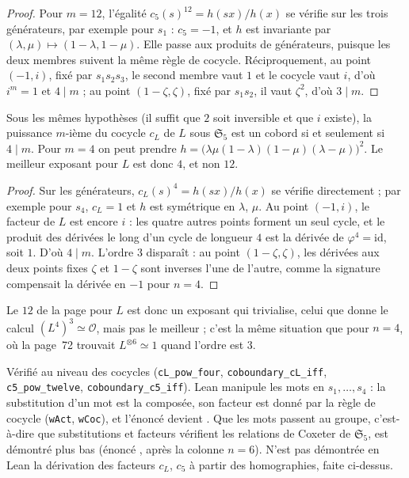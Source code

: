 \begin{proof}
Pour $m = 12$, l'égalité $c_5(s)^{12} = h(sx)/h(x)$ se vérifie sur les trois générateurs, par exemple pour $s_1$ : $c_5 = -1$, et $h$ est invariante par $(\lambda, \mu) \mapsto (1 - \lambda, 1 - \mu)$. Elle passe aux produits de générateurs, puisque les deux membres suivent la même règle de cocycle. Réciproquement, au point $(-1, i)$, fixé par $s_1 s_2 s_3$, le second membre vaut $1$ et le cocycle vaut $i$, d'où $i^m = 1$ et $4 \mid m$ ; au point $(1 - \zeta, \zeta)$, fixé par $s_1 s_2$, il vaut $\zeta^2$, d'où $3 \mid m$.
\end{proof}

\begin{encadre}
\begin{contrexemple}[page 70, colonne $n = 5$, pour $L$ : le \q{$12\,?$} n'est pas le meilleur exposant\piste{146-equivariant-trivialising-exponents}]\label{ce:146-quatre}
Sous les mêmes hypothèses (il suffit que $2$ soit inversible et que $i$ existe), la puissance $m$-ième du cocycle $c_L$ de $L$ sous $\mathfrak S_5$ est un cobord si et seulement si $4 \mid m$. Pour $m = 4$ on peut prendre $h = \bigl(\lambda\mu(1 - \lambda)(1 - \mu)(\lambda - \mu)\bigr)^2$. Le meilleur exposant pour $L$ est donc $4$, et non $12$.
\end{contrexemple}
\end{encadre}

\begin{proof}
Sur les générateurs, $c_L(s)^4 = h(sx)/h(x)$ se vérifie directement ; par exemple pour $s_4$, $c_L = 1$ et $h$ est symétrique en $\lambda$, $\mu$. Au point $(-1, i)$, le facteur de $L$ est encore $i$ : les quatre autres points forment un seul cycle, et le produit des dérivées le long d'un cycle de longueur $4$ est la dérivée de $\varphi^4 = \mathrm{id}$, soit $1$. D'où $4 \mid m$. L'ordre $3$ disparaît : au point $(1 - \zeta, \zeta)$, les dérivées aux deux points fixes $\zeta$ et $1 - \zeta$ sont inverses l'une de l'autre, comme la signature compensait la dérivée en $-1$ pour $n = 4$.
\end{proof}

Le $12$ de la page pour $L$ est donc un exposant qui trivialise, celui que donne le calcul $(L^4)^3 \simeq \mathcal O$, mais pas le meilleur ; c'est la même situation que pour $n = 4$, où la page~72 trouvait $L^{\otimes 6} \simeq 1$ quand l'ordre est $3$.

\begin{sloppypar}
\noindent Vérifié au niveau des cocycles (\texttt{cL\_pow\_four}, \texttt{coboundary\_cL\_iff}, \texttt{c5\_pow\_twelve}, \texttt{coboundary\_c5\_iff}). Lean manipule les mots en $s_1, \ldots, s_4$ : la substitution d'un mot est la composée, son facteur est donné par la règle de cocycle (\texttt{wAct}, \texttt{wCoc}), et l'énoncé  devient . Que les mots passent au groupe, c'est-à-dire que substitutions et facteurs vérifient les relations de Coxeter de $\mathfrak S_5$, est démontré plus bas (énoncé , après la colonne $n = 6$). N'est pas démontrée en Lean la dérivation des facteurs $c_L$, $c_5$ à partir des homographies, faite ci-dessus.
\end{sloppypar}

